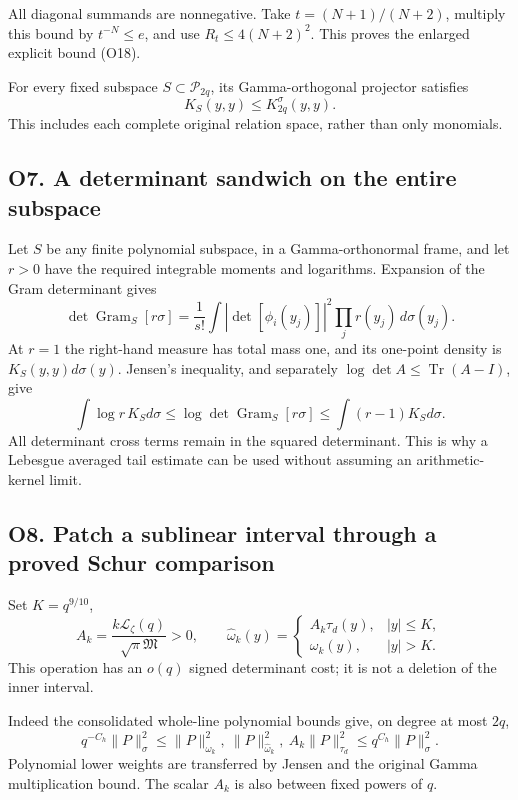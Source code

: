 All diagonal summands are nonnegative. Take \(t=(N+1)/(N+2)\), multiply
this bound by \(t^{-N}\le e\), and use \(R_t\le4(N+2)^2\). This proves
the enlarged explicit bound (O18).

For every fixed subspace \(S\subset\mathcal P_{2q}\), its
Gamma-orthogonal projector satisfies \[
K_S(y,y)\le K_{2q}^\sigma(y,y).\tag{O19}
\] This includes each complete original relation space, rather than only
monomials.

\subsection{O7. A determinant sandwich on the entire
subspace}\label{sa:o7.-a-determinant-sandwich-on-the-entire-subspace}

Let \(S\) be any finite polynomial subspace, in a Gamma-orthonormal
frame, and let \(r>0\) have the required integrable moments and
logarithms. Expansion of the Gram determinant gives \[
\det\operatorname{Gram}_S[r\sigma]
=\frac1{s!}\int |\det[\phi_i(y_j)]|^2\prod_jr(y_j)\,d\sigma(y_j).
\] At \(r=1\) the right-hand measure has total mass one, and its
one-point density is \(K_S(y,y)d\sigma(y)\). Jensen's inequality, and
separately \(\log\det A\le\operatorname{Tr}(A-I)\), give \[
\boxed{\int\log r\,K_Sd\sigma
\le\log\det\operatorname{Gram}_S[r\sigma]
\le\int(r-1)K_Sd\sigma.}\tag{O20}
\] All determinant cross terms remain in the squared determinant. This
is why a Lebesgue averaged tail estimate can be used without assuming an
arithmetic-kernel limit.

\subsection{O8. Patch a sublinear interval through a proved Schur
comparison}\label{sa:o8.-patch-a-sublinear-interval-through-a-proved-schur-comparison}

Set \(K=q^{9/10}\), \[
A_k=\frac{k\mathcal L_\zeta(q)}{\sqrt\pi\mathfrak M}>0,
\qquad
\widehat\omega_k(y)=\begin{cases}A_k\tau_d(y),&|y|\le K,\\
\omega_k(y),&|y|>K.
\end{cases}\tag{O21}
\] This operation has an \(o(q)\) signed determinant cost; it is not a
deletion of the inner interval.

Indeed the consolidated whole-line polynomial bounds give, on degree at
most \(2q\), \[
q^{-C_h}\|P\|_\sigma^2\le
\|P\|_{\omega_k}^2,\ \|P\|_{\widehat\omega_k}^2,
\ A_k\|P\|_{\tau_d}^2
\le q^{C_h}\|P\|_\sigma^2.\tag{O22}
\] Polynomial lower weights are transferred by Jensen and the original
Gamma multiplication bound. The scalar \(A_k\) is also between fixed
powers of \(q\).

